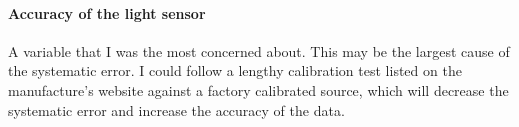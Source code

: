 \documentclass[a4paper,12pt]{article}
\begin{document}
\paragraph{Accuracy of the light sensor}
A variable that I was the most concerned about. This may be the largest cause of the systematic error. I could follow a lengthy calibration test listed on the manufacture's website against a factory calibrated source, which will decrease the systematic error and increase the accuracy of the data.

\newpage
\printbibliography
\end{document}
